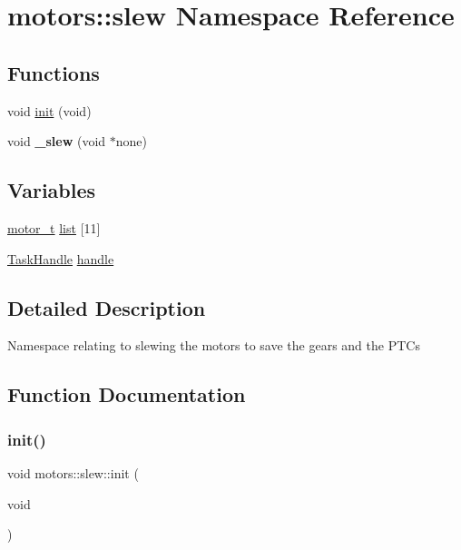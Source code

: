 \hypertarget{namespacemotors_1_1slew}{}\section{motors\+:\+:slew Namespace Reference}
\label{namespacemotors_1_1slew}
\subsection*{Functions}
\begin{DoxyCompactItemize}
\item 
void \hyperlink{namespacemotors_1_1slew_a751ca9ca53ca9e417c79a9f879ea10c5}{init} (void)
\item 
\mbox{\label{namespacemotors_1_1slew_a02ed14d669e810c120b00bf1fde14d47}} 
void {\bfseries \+\_\+slew} (void $\ast$none)
\end{DoxyCompactItemize}
\subsection*{Variables}
\begin{DoxyCompactItemize}
\item 
\hyperlink{structmotor__t}{motor\+\_\+t} \hyperlink{namespacemotors_1_1slew_a80ca3dc0e033fa8ad84aa8ce77765e3b}{list} \mbox{[}11\mbox{]}
\item 
\hyperlink{API_8h_a23dca3c0de10682afb982677ff292f77}{Task\+Handle} \hyperlink{namespacemotors_1_1slew_ac3ee7020adfbe186103f5a8a027eb8fb}{handle}
\end{DoxyCompactItemize}


\subsection{Detailed Description}
Namespace relating to slewing the motors to save the gears and the P\+T\+Cs 

\subsection{Function Documentation}
\mbox{\label{namespacemotors_1_1slew_a751ca9ca53ca9e417c79a9f879ea10c5}} 
\subsubsection{\texorpdfstring{init()}{init()}}
{\footnotesize\ttfamily void motors\+::slew\+::init (\begin{DoxyParamCaption}\item[{void}]{ }\end{DoxyParamCaption})}

